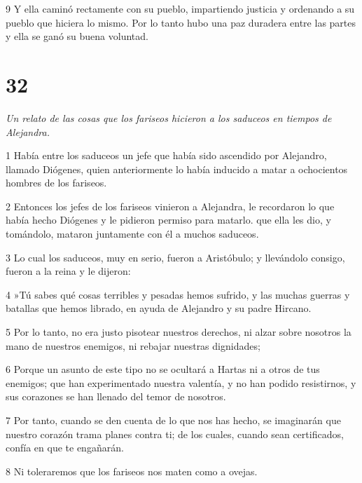 \par 9 Y ella caminó rectamente con su pueblo, impartiendo justicia y ordenando a su pueblo que hiciera lo mismo. Por lo tanto hubo una paz duradera entre las partes y ella se ganó su buena voluntad.

\chapter{32}

\par \textit{Un relato de las cosas que los fariseos hicieron a los saduceos en tiempos de Alejandra.}

\par 1 Había entre los saduceos un jefe que había sido ascendido por Alejandro, llamado Diógenes, quien anteriormente lo había inducido a matar a ochocientos hombres de los fariseos.

\par 2 Entonces los jefes de los fariseos vinieron a Alejandra, le recordaron lo que había hecho Diógenes y le pidieron permiso para matarlo. que ella les dio, y tomándolo, mataron juntamente con él a muchos saduceos.

\par 3 Lo cual los saduceos, muy en serio, fueron a Aristóbulo; y llevándolo consigo, fueron a la reina y le dijeron:

\par 4 »Tú sabes qué cosas terribles y pesadas hemos sufrido, y las muchas guerras y batallas que hemos librado, en ayuda de Alejandro y su padre Hircano.

\par 5 Por lo tanto, no era justo pisotear nuestros derechos, ni alzar sobre nosotros la mano de nuestros enemigos, ni rebajar nuestras dignidades;

\par 6 Porque un asunto de este tipo no se ocultará a Hartas ni a otros de tus enemigos; que han experimentado nuestra valentía, y no han podido resistirnos, y sus corazones se han llenado del temor de nosotros.

\par 7 Por tanto, cuando se den cuenta de lo que nos has hecho, se imaginarán que nuestro corazón trama planes contra ti; de los cuales, cuando sean certificados, confía en que te engañarán.

\par 8 Ni toleraremos que los fariseos nos maten como a ovejas.

